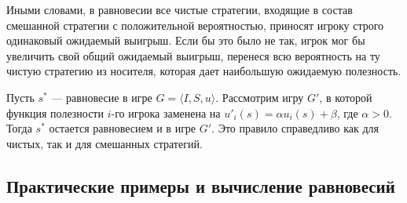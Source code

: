 Иными словами, в равновесии все чистые стратегии, входящие в состав смешанной стратегии с положительной вероятностью, приносят игроку строго одинаковый ожидаемый выигрыш. Если бы это было не так, игрок мог бы увеличить свой общий ожидаемый выигрыш, перенеся всю вероятность на ту чистую стратегию из носителя, которая дает наибольшую ожидаемую полезность.

\begin{remark}
Пусть $s^*$ — равновесие в игре $G = \langle I, S, u \rangle$. Рассмотрим игру $G'$, в которой функция полезности $i$-го игрока заменена на $u'_i(s) = \alpha u_i(s) + \beta$, где $\alpha > 0$. Тогда $s^*$ остается равновесием и в игре $G'$. Это правило справедливо как для чистых, так и для смешанных стратегий.
\end{remark}

\subsection{Практические примеры и вычисление равновесий}

